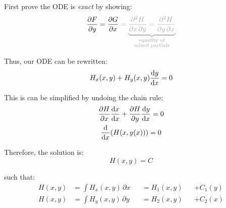 \begin{multicols}{2}
{        First prove the ODE is \textit{exact} by showing:
        \begin{equation*}
            \frac{\partial{F}}{\partial{y}}
            = \frac{\partial{G}}{\partial{x}}
            \Exn{
                {} = \underbrace{
                    \frac{\partial^2{H}}{\partial{x} \, \partial{y}}
                    = \frac{\partial^2{H}}{\partial{y} \, \partial{x}}
                }_{\substack{\text{equality of}\\\text{mixed partials}}}
            }
        \end{equation*}
        \NegateBelowDisplaySkip

        Thus, our ODE can be rewritten:
        \begin{equation*}
            H_x(x, y) + H_y(x, y) \frac{\mathrm{d}{y}}{\mathrm{d}{x}} = 0
        \end{equation*}

        This is can be simplified by undoing the chain rule:
        \begin{gather*}
            \frac{\partial{H}}{\partial{x}} \frac{\diff{x}}{\diff{x}}
            + \frac{\partial{H}}{\partial{y}} \frac{\diff{y}}{\diff{x}}
            = 0 \\
            \frac{\diff{}}{\diff{x}} \parens*{H \parens*{x, y(x)}} = 0
        \end{gather*}

        Therefore, the solution is:
        \begin{equation*}
            H(x, y) = C
        \end{equation*}
        \NegateBelowDisplaySkip

        such that:
        \begin{alignat*}{3}
            H(x, y) &= \int{H_x(x, y) \,\partial{x}} &&= H_1(x, y) &&+ C_1(y) \\
            H(x, y) &= \int{H_y(x, y) \,\partial{y}} &&= H_2(x, y) &&+ C_2(x)
        \end{alignat*}

    }

    
\end{multicols}
\newpage
\begin{multicols}{2}

    
\end{multicols}


